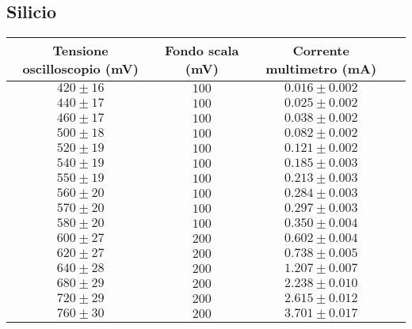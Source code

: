 \documentclass[]{article}
\begin{document}
\subsection{Silicio}
\begin{center}
	\begin{tabular}{|c|c|c|c|}
		\hline
		Tensione oscilloscopio (mV)& Fondo scala (mV) & Corrente multimetro (mA) \\
		\hline
		$ 420\pm 16 $ &$ 100 $ & $ 0.016\pm 0.002 $ \\
		\hline
		$440\pm17 $ &$ 100 $ & $ 0.025\pm0.002 $ \\
		\hline
		$ 460\pm 17 $ &$ 100 $ & $ 0.038\pm 0.002 $ \\
		\hline
		$ 500\pm 18 $ &$ 100 $ & $ 0.082\pm 0.002 $ \\
		\hline
		$ 520\pm 19 $ &$ 100 $ & $0.121\pm 0.002$ \\
		\hline
		$ 540\pm 19 $ &$ 100 $ & $ 0.185\pm 0.003 $ \\
		\hline
		$ 550\pm 19 $ &$ 100 $ & $ 0.213\pm 0.003 $ \\
		\hline
		$ 560\pm 20 $ &$ 100 $ & $ 0.284\pm 0.003 $ \\
		\hline
		$ 570\pm 20 $ &$ 100 $ & $ 0.297\pm 0.003 $ \\
		\hline
		$ 580\pm 20 $ &$ 100 $ & $ 0.350\pm 0.004 $ \\
		\hline
		$ 600\pm 27 $ &$ 200 $ & $ 0.602\pm0.004 $ \\
		\hline
		$ 620\pm 27 $ &$ 200 $ & $ 0.738\pm0.005 $ \\
		\hline
		$ 640\pm 28 $ &$ 200 $ & $ 1.207\pm0.007 $ \\
		\hline
		$ 680\pm 29 $ &$ 200 $ & $ 2.238\pm 0.010 $ \\
		\hline
		$ 720\pm 29 $ &$ 200 $ & $ 2.615\pm 0.012 $ \\
		\hline
		$ 760\pm 30 $ &$ 200 $ & $ 3.701\pm 0.017 $ \\
		\hline
			\end{tabular}
	\end{center}
\end{document}

